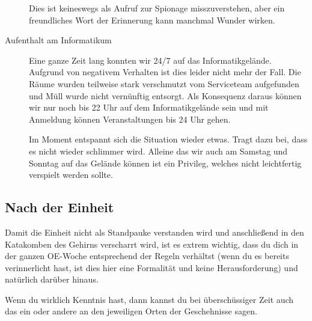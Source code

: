 \documentclass[a4paper,11pt]{scrartcl} %
\begin{document}
\begin{description}
		Dies ist keineswegs als Aufruf zur Spionage misszuverstehen, aber ein freundliches Wort der Erinnerung kann manchmal Wunder wirken.
		\item[Aufenthalt am Informatikum] Eine ganze Zeit lang konnten wir 24/7 auf das Informatikgelände. Aufgrund von negativem Verhalten ist dies leider nicht mehr der Fall. Die Räume wurden teilweise stark verschmutzt vom Serviceteam aufgefunden und Müll wurde nicht vernünftig entsorgt. Als Konsequenz daraus können wir nur noch bis 22 Uhr auf dem Informatikgelände sein und mit Anmeldung können Veranstaltungen bis 24 Uhr gehen.
		
		Im Moment entspannt sich die Situation wieder etwas. Tragt dazu bei, dass es nicht wieder schlimmer wird. Alleine das wir auch am Samstag und Sonntag auf das Gelände können ist ein Privileg, welches nicht leichtfertig verspielt werden sollte.
	\end{description}

  \subsection{Nach der Einheit} 
Damit die Einheit nicht als Standpauke verstanden wird und anschließend in den Katakomben des Gehirns verscharrt wird, ist es extrem wichtig, dass du dich in der ganzen OE-Woche entsprechend der Regeln verhältst (wenn du es bereits verinnerlicht hast, ist dies hier eine Formalität und keine Herausforderung) und natürlich darüber hinaus.

Wenn du wirklich Kenntnis hast, dann kannst du bei überschüssiger Zeit auch das ein oder andere an den jeweiligen Orten der Geschehnisse sagen.
\end{document}
